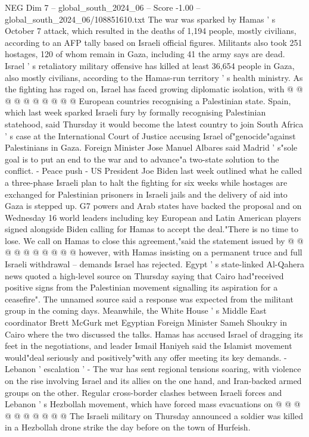 \begin{textsample}{NEG Dim 7 – global\_south\_2024\_06 – Score -1.00 – global\_south\_2024\_06/108851610.txt}
The war was sparked by Hamas ' s October 7 attack, which resulted in the deaths of 1,194 people, mostly civilians, according to an AFP tally based on Israeli official figures.
Militants also took 251 hostages, 120 of whom remain in Gaza, including 41 the army says are dead.
Israel ' s retaliatory military offensive has killed at least 36,654 people in Gaza, also mostly civilians, according to the Hamas-run territory ' s health ministry.
As the fighting has raged on, Israel has faced growing diplomatic isolation, with @ @ @ @ @ @ @ @ @ @ European countries recognising a Palestinian state.
Spain, which last week sparked Israeli fury by formally recognising Palestinian statehood, said Thursday it would become the latest country to join South Africa ' s case at the International Court of Justice accusing Israel of"genocide"against Palestinians in Gaza.
Foreign Minister Jose Manuel Albares said Madrid ' s"sole goal is to put an end to the war and to advance"a two-state solution to the conflict. - Peace push - US President Joe Biden last week outlined what he called a three-phase Israeli plan to halt the fighting for six weeks while hostages are exchanged for Palestinian prisoners in Israeli jails and the delivery of aid into Gaza is stepped up.
G7 powers and Arab states have backed the proposal and on Wednesday 16 world leaders including key European and Latin American players signed alongside Biden calling for Hamas to accept the deal."There is no time to lose.
We call on Hamas to close this agreement,"said the statement issued by @ @ @ @ @ @ @ @ @ @ however, with Hamas insisting on a permanent truce and full Israeli withdrawal -- demands Israel has rejected.
Egypt ' s state-linked Al-Qahera news quoted a high-level source on Thursday saying that Cairo had"received positive signs from the Palestinian movement signalling its aspiration for a ceasefire".
The unnamed source said a response was expected from the militant group in the coming days.
Meanwhile, the White House ' s Middle East coordinator Brett McGurk met Egyptian Foreign Minister Sameh Shoukry in Cairo where the two discussed the talks.
Hamas has accused Israel of dragging its feet in the negotiations, and leader Ismail Haniyeh said the Islamist movement would"deal seriously and positively"with any offer meeting its key demands. - Lebanon ' escalation ' - The war has sent regional tensions soaring, with violence on the rise involving Israel and its allies on the one hand, and Iran-backed armed groups on the other.
Regular cross-border clashes between Israeli forces and Lebanon ' s Hezbollah movement, which have forced mass evacuations on @ @ @ @ @ @ @ @ @ @ The Israeli military on Thursday announced a soldier was killed in a Hezbollah drone strike the day before on the town of Hurfeish.

\end{textsample}
